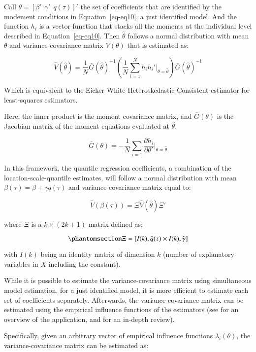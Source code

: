 \documentclass[
  authoryear,
  review,
  1p]{elsarticle}
\begin{document}
Call \(\theta=[ \beta' \ \ \gamma' \ \ q(\tau) ]'\) the set of
coefficients that are identified by the modement conditions in
Equation~\ref{eq-eq10}, a just identified model. And the function
\(h_i\) is a vector function that stacks all the moments at the
individual level described in Equation~\ref{eq-eq10}. Then
\(\hat\theta\) follows a normal distribution with mean \(\theta\) and
variance-covariance matrix \(V(\theta)\) that is estimated as:

\[
\hat{V}(\hat\theta)=\frac{1}{N} 
\bar G(\hat\theta)^{-1} 
\left( \frac{1}{N} \sum_{i=1}^N h_i h_i'  \Big|_{\theta=\hat\theta} \right) 
\bar G(\hat\theta)^{-1} 
\]

Which is equivalent to the Eicker-White Heteroskedastic-Consistent
estimator for least-squares estimators.

Here, the inner product is the moment covariance matrix, and
\(\bar{G}(\theta)\) is the Jacobian matrix of the moment equations
evaluated at \(\hat\theta\).

\[\bar{G}(\theta) =-\frac{1}{N} \sum_{i=1} \frac{\partial h_i}{\partial \theta'} \Big|_{\theta=\hat\theta}\]

In this framework, the quantile regression coefficients, a combination
of the location-scale-quantile estimates, will follow a normal
distribution with mean \(\beta(\tau) = \beta+\gamma q(\tau)\) and
variance-covariance matrix equal to:

\[\hat{V}(\beta(\tau)) = \Xi \hat{V}(\hat\theta) \Xi'
\]

where \(\Xi\) is a \(k \times (2k+1)\) matrix defined as:

\begin{equation}\phantomsection\label{eq-eqqtile}{\Xi = [ I(k), \hat q(\tau) \times I(k), \hat \gamma ]
}\end{equation}

with \(I(k)\) being an identity matrix of dimension \(k\) (number of
explanatory variables in \(X\) including the constant).

While it is possible to estimate the variance-covariance matrix using
simultaneous model estimation, for a just identified model, it is more
efficient to estimate each set of coefficients separately. Afterwards,
the variance-covariance matrix can be estimated using the empirical
influence functions of the estimators (see \citet{jann_2020} for an
overview of the application, and \citet{hampel2005} for an in-depth
review).

Specifically, given an arbitrary vector of empirical influence functions
\(\lambda_i(\theta)\), the variance-covariance matrix can be estimated
as:
\end{document}
